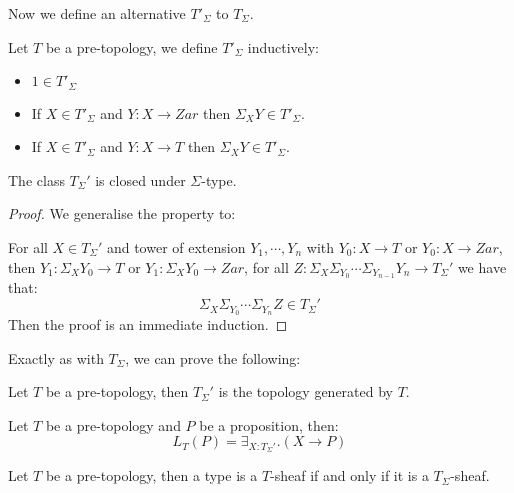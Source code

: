 Now we define an alternative $T'_\Sigma$ to $T_\Sigma$. 

\begin{definition}
Let $T$ be a pre-topology, we define $T'_\Sigma$ inductively:
\begin{itemize}
\item $1\in T'_\Sigma$
\item If $X\in T'_\Sigma$ and $Y:X\to Zar$ then $\Sigma_XY\in T'_\Sigma$.
\item If $X\in T'_\Sigma$ and $Y:X\to T$ then $\Sigma_XY\in T'_\Sigma$.
\end{itemize}
\end{definition}

\begin{lemma}
The class $T_\Sigma'$ is closed under $\Sigma$-type.
\end{lemma}

\begin{proof}
We generalise the property to: 

For all $X\in T_\Sigma'$ and tower of extension $Y_1,\cdots,Y_n$ with $Y_0:X\to T$ or $Y_0:X\to Zar$, then $Y_1:\Sigma_{X}Y_0\to T$ or $Y_1:\Sigma_{X}Y_0\to Zar$, for all $Z:\Sigma_X\Sigma_{Y_0}\cdots\Sigma_{Y_{n-1}}Y_n \to T_\Sigma'$ we have that:
\[\Sigma_X\Sigma_{Y_0}\cdots\Sigma_{Y_{n}}Z \in T_\Sigma'\]
Then the proof is an immediate induction.
\end{proof}

Exactly as with $T_\Sigma$, we can prove the following:

\begin{lemma}\label{TSigma'-topology}
Let $T$ be a pre-topology, then $T_\Sigma'$ is the topology generated by $T$.
\end{lemma}

\begin{lemma}\label{Tsigma'-proposition}
Let $T$ be a pre-topology and $P$ be a proposition, then:
\[L_T(P) = \exists_{X:T_\Sigma'}. (X\to P)\]
\end{lemma}

\begin{lemma}\label{Tsigma'-sheaf-generated}
Let $T$ be a pre-topology, then a type is a $T$-sheaf if and only if it is a $T_\Sigma$-sheaf.
\end{lemma}



